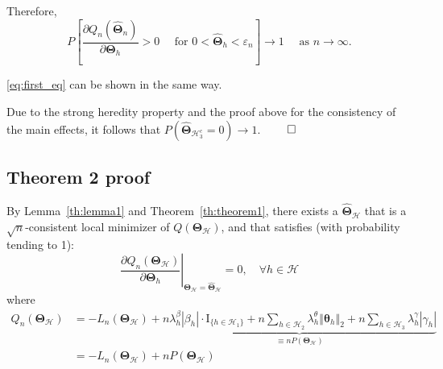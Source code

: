 \documentclass[12pt,letter]{article}\usepackage[]{graphicx}\usepackage[]{color}
\newcommand{\bTheta}{\boldsymbol{\Theta}}
\newcommand{\btheta}{\boldsymbol{\theta}}
\begin{document}
Therefore,
\[
P\left[\frac{\partial Q_{n}\left(\widehat{\boldsymbol{\Theta}}_{n}\right)}{\partial\bTheta_{h}}>0\quad\text{ for }0<\widehat{\bTheta}_{h}<\varepsilon_{n}\right]\rightarrow1\quad\text{ as }n\rightarrow\infty.
\]

\eqref{eq:first_eq} can be shown in the same way. 

Due to the strong heredity property and the proof above for the consistency of the main effects, it follows that $P\left(\widehat{\bTheta}_{\mathcal{H}_{3}^{c}}=0\right)\rightarrow1$. $\qed$

\begin{comment}
\begin{itemize}
	\item For $(k,k^{\prime})$ where $(k,k^{\prime})\in\mathcal{A}_{2}^{c}$
	and $k,k^{\prime}\in\mathcal{A}_{1}:$ we can prove $P\left(\hat{\gamma}_{kk^{\prime}}=0\right)\rightarrow1$
	by a similar reasoning
	\item For $(k,k^{\prime})$ where $(k,k^{\prime})\in\mathcal{A}_{2}^{c}$
	and either $k$ or $k^{\prime}$ is in $\mathcal{A}_{1}^{c}$: without
	loss of generality, assume that $\beta_{k}^{*}=0$. Notice that $\hat{\beta}_{k}=0$
	implies $\hat{\gamma}_{kk^{\prime}}=0$, because if $\hat{\gamma}_{kk^{\prime}}\neq0$,
	then the value of the loss function does not change but the value
	of the penalty function will increase. Since we already have $P\left(\hat{\beta}_{k}=0\right)\rightarrow1$,
	we can conclude $P\left(\hat{\gamma}_{kk^{\prime}}=0\right)\rightarrow1$
	as well. $\qed$
\end{itemize}
\end{comment}


\subsection{Theorem 2 proof}

By Lemma~\eqref{th:lemma1} and Theorem~\eqref{th:theorem1}, there exists a $\widehat{\bTheta}_{\mathcal{H}}$ that is a $\sqrt{n}$-consistent local minimizer of $Q(\bTheta_{\mathcal{H}})$, and that satisfies (with probability tending to 1):
\begin{equation}
\left.\frac{\partial Q_{n}\left(\boldsymbol{\Theta}_{\mathcal{H}}\right)}{\partial\bTheta_{h}}\right|_{\boldsymbol{\Theta}_{\mathcal{H}}=\widehat{\boldsymbol{\Theta}}_{\mathcal{H}}}=0,\quad\forall h\in\mathcal{H}\label{eq:eq_14}
\end{equation}
where
\begin{align}
Q_n(\bTheta_{\mathcal{H}})
&=-L_n(\bTheta_{\mathcal{H}})+\underbrace{n\lambda_{h}^{\beta}\left|\beta_{h}\right| \cdot \textrm{I}_{\lbrace h \in \mathcal{H}_1 \rbrace} + n\sum_{h \in \mathcal{H}_2}      \lambda_{h}^{\theta}\left\Vert \btheta_{h}\right\Vert _{2}  +n\sum_{h \in \mathcal{H}_3}\lambda_{h}^{\gamma}\left|\gamma_{h}\right|}_{\equiv n P(\bTheta_{\mathcal{H}})} \nonumber \\
& = -L_n(\bTheta_{\mathcal{H}})+n P(\bTheta_{\mathcal{H}}) \label{eq:eq_14.5}
\end{align}
\end{document}
